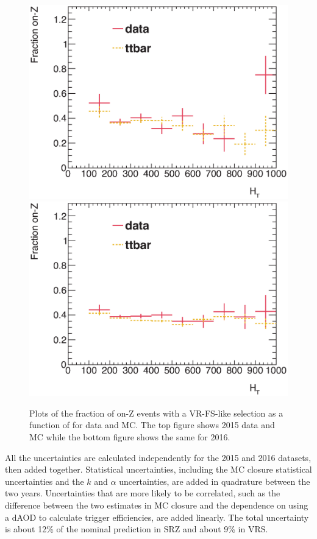 \begin{centering}
\begin{figure}[!hbt]
\myfloatalign
\includegraphics[width=.85\linewidth]{figures/fs/frac_vs_ht_2015.eps}
\includegraphics[width=.85\linewidth]{figures/fs/frac_vs_ht_2016.eps}
\caption{Plots of the fraction of on-Z events with a VR-FS-like selection as a function of \HT for data and \ttbar \ac{MC}. The top figure shows 2015 data and \ac{MC} while the bottom figure shows the same for 2016.}
\label{fig:fs_frac_ht}
\end{figure}
\end{centering}

All the uncertainties are calculated independently for the 2015 and 2016 datasets, then added together. Statistical uncertainties, including the \ac{MC} closure statistical uncertainties and the $k$ and $\alpha$ uncertainties, are added in quadrature between the two years. Uncertainties that are more likely to be correlated, such as the difference between the two estimates in \ac{MC} closure and the dependence on using a dAOD to calculate trigger efficiencies, are added linearly. The total uncertainty is about 12\% of the nominal prediction in SRZ and about 9\% in VRS. 

